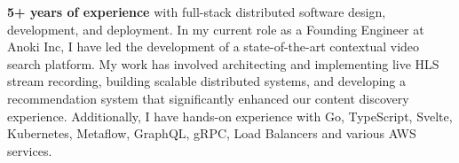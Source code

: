 
\textbf{5+ years of experience} with full-stack distributed software design, development, and deployment. In my current role as a Founding Engineer at Anoki Inc, I have led the development of a state-of-the-art contextual video search platform. My work has involved architecting and implementing live HLS stream recording, building scalable distributed systems, and developing a recommendation system that significantly enhanced our content discovery experience. Additionally, I have hands-on experience with Go, TypeScript, Svelte, Kubernetes, Metaflow, GraphQL, gRPC, Load Balancers and various AWS services.


